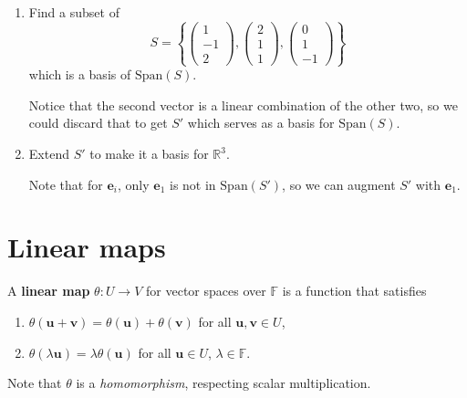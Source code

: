 \documentclass[letter-paper]{tufte-book}
\newenvironment{example}[1][Example]{\begin{trivlist}
\item[\hskip \labelsep {\bfseries #1}]}{\end{trivlist}}
\newcommand{\eb}{{\boldsymbol{e}}}
\newcommand{\ub}{{\boldsymbol{u}}}
\newcommand{\vb}{{\boldsymbol{v}}}
\begin{document}
\begin{example}
  \begin{enumerate}
    \item Find a subset of
    \begin{equation*}
      S = \left\{\begin{pmatrix}1 \\ -1\\ 2\end{pmatrix}, \begin{pmatrix}2 \\ 1\\ 1\end{pmatrix}, \begin{pmatrix}0 \\ 1\\ -1\end{pmatrix}\right\}
    \end{equation*}
    which is a basis of $\mbox{Span}(S)$.
    
    Notice that the second vector is a linear combination of the other two, so we could discard that to get $S'$ which serves as a basis for $\mbox{Span}(S)$.
    
    \item Extend $S'$ to make it a basis for $\mathbb{R}^3$.
    
    Note that for $\eb_i$, only $\eb_1$ is not in $\mbox{Span}(S')$, so we can augment $S'$ with $\eb_1$.
  \end{enumerate}
\end{example}


\section{Linear maps}

A \textbf{linear map} $\theta : U \to V$ for vector spaces over $\mathbb{F}$ is a function that satisfies
\begin{enumerate}
  \item $\theta(\ub + \vb) = \theta(\ub) + \theta(\vb)$ for all $\ub, \vb \in U$,
  \item $\theta(\lambda \ub) = \lambda \theta(\ub)$ for all $\ub \in U$,
  $\lambda \in \mathbb{F}$.
\end{enumerate}

Note that $\theta$ is a \emph{homomorphism}, respecting scalar multiplication.
\end{document}
